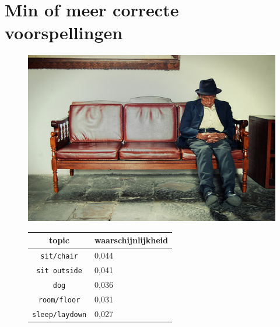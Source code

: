 \section{Min of meer correcte voorspellingen}
\begin{figure}[!htb]
    \centering
    \begin{minipage}[t]{.5\linewidth}
    \centering
    \vspace{0pt}
    \includegraphics[width=\textwidth]{Images/LDA/4862204000.jpg}
    \end{minipage}\hfill
    \begin{minipage}[t]{.5\textwidth}
    \centering
    \vspace{0pt}
    \begin{tabular}{cl}
            topic                           & waarschijnlijkheid\\
            \hline
            \texttt{sit/chair}             & 0,044 \\
            \texttt{sit outside}                   & 0,041 \\
            \texttt{dog}                 & 0,036 \\
            \texttt{room/floor}           & 0,031 \\
            \texttt{sleep/laydown}        & 0,027\\
            \hline
        \end{tabular}
    \end{minipage}
\end{figure}

